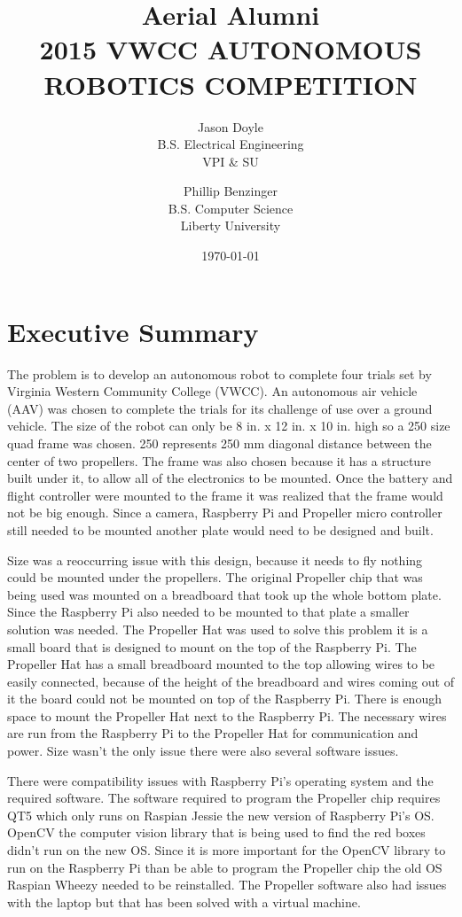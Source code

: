 \documentclass{article}
\title{ Aerial Alumni \\ 2015  VWCC AUTONOMOUS ROBOTICS COMPETITION }
\author{ Jason Doyle \\ B.S. Electrical Engineering \\ VPI \& SU \and Phillip Benzinger \\ B.S. Computer Science \\ Liberty University }
\date{ \today }
\begin{document}
\maketitle

\clearpage

\tableofcontents
\listoffigures
\clearpage

\section{Executive Summary}

	The problem is to develop an autonomous robot to complete four trials set by Virginia Western Community College (VWCC). An autonomous air vehicle (AAV) was chosen to complete the trials for its challenge of use over a ground vehicle. The size of the robot can only be 8 in. x 12 in. x 10 in. high so a 250 size quad frame was chosen. 250 represents 250 mm diagonal distance between the center of two propellers. The frame was also chosen because it has a structure built under it, to allow all of the electronics to be mounted. Once the battery and flight controller were mounted to the frame it was realized that the frame would not be big enough. Since a camera, Raspberry Pi and Propeller micro controller still needed to be mounted another plate would need to be designed and built. 
	
	Size was a reoccurring issue with this design, because it needs to fly nothing could be mounted under the propellers. The original Propeller chip that was being used was mounted on a breadboard that took up the whole bottom plate. Since the Raspberry Pi also needed to be mounted to that plate a smaller solution was needed. The Propeller Hat was used to solve this problem it is a small board that is designed to mount on the top of the Raspberry Pi. The Propeller Hat has a small breadboard mounted to the top allowing wires to be easily connected, because of the height of the breadboard and wires coming out of it the board could not be mounted on top of the Raspberry Pi. There is enough space to mount the Propeller Hat next to the Raspberry Pi. The necessary wires are run from the Raspberry Pi to the Propeller Hat for communication and power. Size wasn't the only issue there were also several software issues.
	
	There were compatibility issues with Raspberry Pi's operating system and the required software. The software required to program the Propeller chip requires QT5 which only runs on Raspian Jessie the new version of Raspberry Pi's OS. OpenCV the computer vision library that is being used to find the red boxes didn't run on the new OS. Since it is more important for the OpenCV library to run on the Raspberry Pi than be able to program the Propeller chip the old OS Raspian Wheezy needed to be reinstalled. The Propeller software also had issues with the laptop but that has been solved with a virtual machine.
\end{document}
